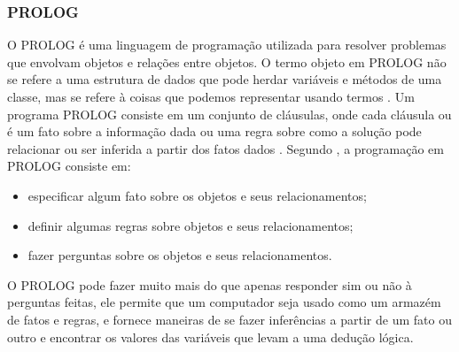 \subsubsection{PROLOG}
O PROLOG é uma linguagem de programação utilizada para resolver problemas que envolvam objetos e relações entre objetos. O termo objeto em PROLOG não se refere a uma estrutura de dados que pode herdar variáveis e métodos de uma classe, mas se refere à coisas que podemos representar usando termos \cite{clocksin2003programming}.
Um programa PROLOG consiste em um conjunto de cláusulas, onde cada cláusula ou é um fato sobre a informação dada ou uma regra sobre como a solução pode relacionar ou ser inferida a partir dos fatos dados \cite{clocksin2003programming}.
Segundo \cite{clocksin2003programming}, a programação em PROLOG consiste em: 
\begin{itemize}
\item especificar algum fato sobre os objetos e seus relacionamentos;
\item definir algumas regras sobre objetos e seus relacionamentos;
\item fazer perguntas sobre os objetos e seus relacionamentos.
\end{itemize}
O PROLOG pode fazer muito mais do que apenas responder sim ou não à perguntas feitas, ele permite que um computador seja usado como um armazém de fatos e regras, e fornece maneiras de se fazer inferências a partir de um fato ou outro e encontrar os valores das variáveis que levam a uma dedução lógica.
